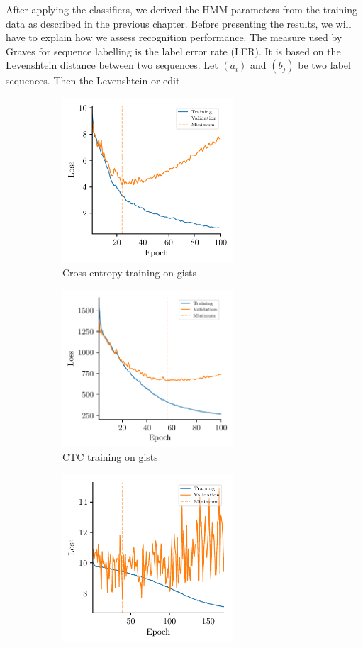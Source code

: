 After applying the classifiers, we derived the HMM parameters from the training
data as described in the previous chapter. Before presenting the results, we
will have to explain how we assess recognition performance. The measure used by
Graves for sequence labelling is the label error rate (LER). It is based on the
Levenshtein distance between two sequences. Let $(a_{i})$ and $(b_{j})$ be two
label sequences. Then the Levenshtein or edit
\begin{figure}[H]
  \begin{subfigure}[t]{3in}
  \centering
    \includegraphics[width=2.5in]{figures/results/losses/gru-gists}
    \caption{Cross entropy training on gists}
    \label{fig:losses-ce-gists}
  \end{subfigure}
  \hfill
  \begin{subfigure}[t]{3in}
  \centering
    \includegraphics[width=2.5in]{figures/results/losses/ctc-gists}
    \caption{CTC training on gists}
    \label{fig:losses-ctc-gists}
  \end{subfigure}
  \begin{subfigure}[t]{3in}
  \centering
    \includegraphics[width=2.5in]{figures/results/losses/gru-inceptionv3}

\end{subfigure}
\end{figure}
